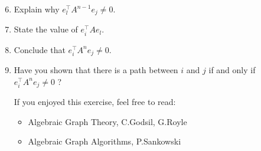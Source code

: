 \begin{enumerate}
\setcounter{enumi}{5}
\item Explain why $e_l^\top A^{n-1} e_j \neq 0$.

\sol{}
\item State the value of $e_i^\top A e_l$.

\sol{}
\item Conclude that $e_i^\top A^n e_j \neq 0$.

\sol{}
\item Have you shown that there is a path between $i$ and $j$ if and only if $e_i^\top A^n e_j\neq 0$ ?

\sol{}

If you enjoyed this exercise, feel free to read:
\begin{itemize}
    \item Algebraic Graph Theory, C.Godsil, G.Royle
    \item Algebraic Graph Algorithms, P.Sankowski
\end{itemize}

\end{enumerate}